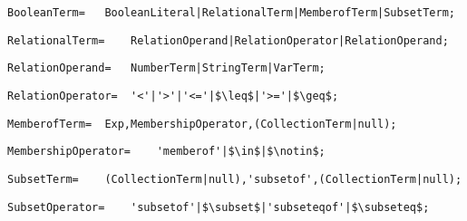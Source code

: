 \documentclass{article}
\begin{document}
    \begin{flushleft}
    \begin{lstlisting}[mathescape=true, breaklines=true]
     BooleanTerm= 	BooleanLiteral|RelationalTerm|MemberofTerm|SubsetTerm;
    \end{lstlisting}
    \end{flushleft}
    \begin{flushleft}
    \begin{lstlisting}[mathescape=true, breaklines=true]
     RelationalTerm= 	RelationOperand|RelationOperator|RelationOperand;
    \end{lstlisting}
    \end{flushleft}
    \begin{flushleft}
    \begin{lstlisting}[mathescape=true, breaklines=true]
     RelationOperand= 	NumberTerm|StringTerm|VarTerm;
    \end{lstlisting}
    \end{flushleft}
    \begin{flushleft}
    \begin{lstlisting}[mathescape=true, breaklines=true]
     RelationOperator= 	'<'|'>'|'<='|$\leq$|'>='|$\geq$;
    \end{lstlisting}
    \end{flushleft}
    \begin{flushleft}
    \begin{lstlisting}[mathescape=true, breaklines=true]
     MemberofTerm= 	Exp,MembershipOperator,(CollectionTerm|null);
    \end{lstlisting}
    \end{flushleft}
    \begin{flushleft}
    \begin{lstlisting}[mathescape=true, breaklines=true]
     MembershipOperator= 	'memberof'|$\in$|$\notin$;
    \end{lstlisting}
    \end{flushleft}
    \begin{flushleft}
    \begin{lstlisting}[mathescape=true, breaklines=true]
     SubsetTerm= 	(CollectionTerm|null),'subsetof',(CollectionTerm|null);
    \end{lstlisting}
    \end{flushleft}
    \begin{flushleft}
    \begin{lstlisting}[mathescape=true, breaklines=true]
     SubsetOperator= 	'subsetof'|$\subset$|'subseteqof'|$\subseteq$;
    \end{lstlisting}
    \end{flushleft}
\end{document}
